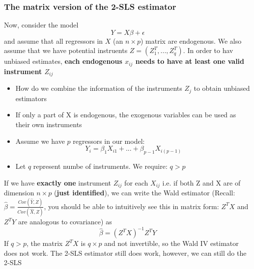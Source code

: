 \documentclass[10pt, oneside]{article}
\begin{document}
\subsubsection{The matrix version of the 2-SLS estimator}
Now, consider the model \[Y=X\beta + \epsilon\]and assume that all regressors in $X$ (an $n\times p$) matrix are endogenous. We also assume that we have potential instruents $Z=(Z_1^T , ..., Z_q^T)$. In order to hav unbiased estimates, \textbf{each endogenous $x_{ij}$ needs to have at least one valid instrument $Z_{ij}$}
\begin{itemize}
    \item How do we combine the information of the instruments $Z_j$ to obtain unbiased estimators
    \item If only a part of X is endogenous, the exogenous variables can be used as their own instruments
    \item Assume we have $p$ regressors in our model:
    \[Y_i = \beta_1 X_{i1} + ... + \beta_{p-1} X_{i(p-1)}\]
    \item Let $q$ represent numbe  of instruments. We require: $q > p$
\end{itemize}
If we have \textbf{exactly one} instrument $Z_{ij}$ for each $X_{ij}$ i.e. if both Z and X are of dimension $n\times p$ (\textbf{just identified}), we can write the Wald estimator (Recall: $\hat \beta = \frac{Cov(\hat Y, Z)}{Cov(\hat X,Z)}$, you should be able to intuitively see this in matrix form: $Z^TX$ and $Z^T Y$ are analogous to covariance) as \[\hat \beta = (Z^TX)^{-1}Z^T Y\]
If $q > p$, the matrix $Z^TX$ is $q\times p$ and not invertible, so the Wald IV estimator does not work. The 2-SLS estimator still does work, however, we can still do the 2-SLS
\end{document}
